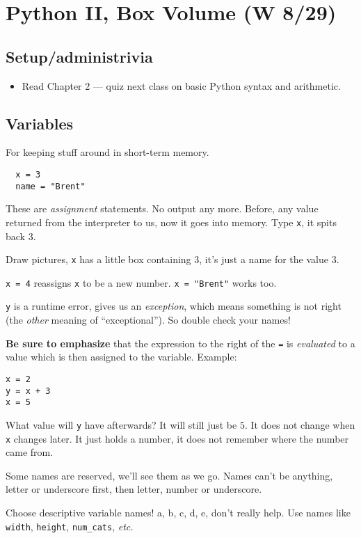 \documentclass{article}
\newcommand{\etc}{\emph{etc.}\xspace}
\begin{document}
\newpage

\section{Python II, Box Volume (W 8/29)}

\subsection*{Setup/administrivia}
\begin{itemize}
\item Read Chapter 2 --- quiz next class on basic Python syntax and arithmetic.
\end{itemize}

\subsection*{Variables}

For keeping stuff around in short-term memory.
\begin{verbatim}
  x = 3
  name = "Brent"
\end{verbatim}
These are \emph{assignment} statements.  No output any more. Before,
any value returned from the interpreter to us, now it goes into
memory.  Type \texttt{x}, it spits back 3.

Draw pictures, \texttt{x} has a little box containing $3$, it's just a
name for the value $3$.

\texttt{x = 4} reassigns \texttt{x} to be a new number.  \texttt{x =
  "Brent"} works too.

\texttt{y} is a runtime error, gives us an \emph{exception}, which
means something is not right (the \emph{other} meaning of
``exceptional''). So double check your names!

\textbf{Be sure to emphasize} that the expression to the right of
the \texttt{=} is \emph{evaluated} to a value which is then assigned
to the variable.  Example:
\begin{verbatim}
x = 2
y = x + 3
x = 5
\end{verbatim}
What value will \texttt{y} have afterwards?  It will still just be
$5$.  It does not change when \texttt{x} changes later.  It just
holds a number, it does not remember where the number came from.

Some names are reserved, we'll see them as we go.
Names can't be anything, letter or underscore first, then letter,
number or underscore.

Choose descriptive variable names! a, b, c, d, e, don't really help.
Use names like \texttt{width}, \texttt{height},
\texttt{num\_cats}, \etc
\end{document}
